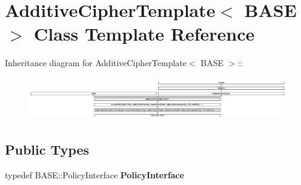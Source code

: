 \hypertarget{class_additive_cipher_template}{
\section{AdditiveCipherTemplate$<$ BASE $>$ Class Template Reference}
\label{class_additive_cipher_template}
}
Inheritance diagram for AdditiveCipherTemplate$<$ BASE $>$::\begin{figure}[H]
\begin{center}
\leavevmode
\includegraphics[height=1.86667cm]{class_additive_cipher_template}
\end{center}
\end{figure}
\subsection*{Public Types}
\begin{DoxyCompactItemize}
\item 
\hypertarget{class_additive_cipher_template_a79b269d3b9def1c573eb8b73926bbfdf}{
typedef BASE::PolicyInterface {\bfseries PolicyInterface}}
\label{class_additive_cipher_template_a79b269d3b9def1c573eb8b73926bbfdf}

\end{DoxyCompactItemize}
